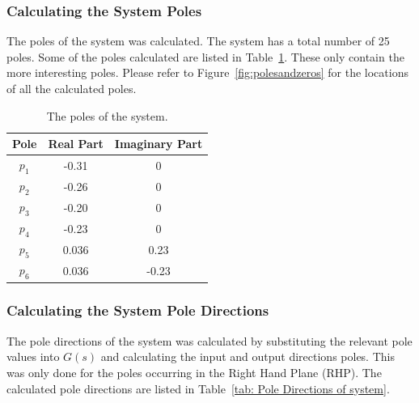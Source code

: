 \subsubsection{Calculating the System Poles}

The poles of the system was calculated. The system has a total  number of 25 poles. Some of the poles calculated are listed in Table~\ref{tab: Poles of system}. These only contain the more interesting poles. Please refer to Figure~\ref{fig:polesandzeros} for the locations of all the calculated poles.

\begin{table}[H]
	\centering
	\caption{The poles of the system.}
	\begin{tabular}{ccc}
		\hline
		\textbf{Pole} & \textbf{Real Part} & \textbf{Imaginary Part} \\\hline
		$p_1$            & -0.31            & 0                       \\
		$p_2$            & -0.26            & 0                       \\
		$p_3$            & -0.20            & 0                 \\
		$p_4$            & -0.23            & 0                 \\
		$p_5$            & 0.036             & 0.23                  \\
		$p_6$            & 0.036             & -0.23   \\\hline             
	\end{tabular}
	\label{tab: Poles of system}
\end{table}

\subsubsection{Calculating the System Pole Directions}
\label{sec:Pole Directions}

The pole directions of the system was calculated by substituting the relevant pole values into $G(s)$ and calculating the input and output directions poles. This was only done for the poles occurring in the Right Hand Plane (RHP). The calculated pole directions are listed in Table~\ref{tab: Pole Directions of system}.

